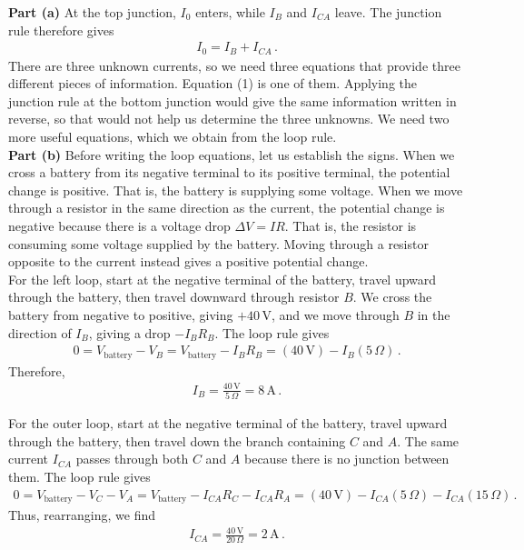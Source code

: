 \documentclass[11pt]{article}
\begin{document}
\noindent\textbf{Part (a)} At the top junction, $I_0$ enters, while $I_B$ and $I_{CA}$ leave. The junction rule therefore gives
\begin{align*}
I_0=I_B+I_{CA}\,. \tag{1}
\end{align*}
There are three unknown currents, so we need three equations that provide three different pieces of information. Equation (1) is one of them. Applying the junction rule at the bottom junction would give the same information written in reverse, so that would not help us determine the three unknowns. We need two more useful equations, which we obtain from the loop rule.\\

\noindent\textbf{Part (b)} Before writing the loop equations, let us establish the signs. When we cross a battery from its negative terminal to its positive terminal, the potential change is positive. That is, the battery is supplying some voltage. When we move through a resistor in the same direction as the current, the potential change is negative because there is a voltage drop $\Delta V = IR$. That is, the resistor is consuming some voltage supplied by the battery. Moving through a resistor opposite to the current instead gives a positive potential change.\\

For the left loop, start at the negative terminal of the battery, travel upward through the battery, then travel downward through resistor $B$. We cross the battery from negative to positive, giving $+40$\,V, and we move through $B$ in the direction of $I_B$, giving a drop $-I_BR_B$. The loop rule gives
\begin{align*}
0 = V_{\text{battery}}-V_B=V_{\text{battery}}-I_BR_B = (40\,\text{V})-I_B(5\,\Omega)\,.\tag{2}
\end{align*}
Therefore,
\begin{align*}
I_B=\frac{40\,\text{V}}{5\,\Omega}=8\,\text{A}\,. 
\end{align*}

For the outer loop, start at the negative terminal of the battery, travel upward through the battery, then travel down the branch containing $C$ and $A$. The same current $I_{CA}$ passes through both $C$ and $A$ because there is no junction between them. The loop rule gives
\begin{align*}
0= V_{\text{battery}}-V_C-V_A= V_{\text{battery}}-I_{CA}R_C-I_{CA}R_A=(40\,\text{V})-I_{CA}(5\,\Omega)-I_{CA}(15\,\Omega)\,.\tag{3}
\end{align*}
Thus, rearranging, we find
\begin{align*}
I_{CA}=\frac{40\,\text{V}}{20\,\Omega}=2\,\text{A}\,. 
\end{align*}
\end{document}
